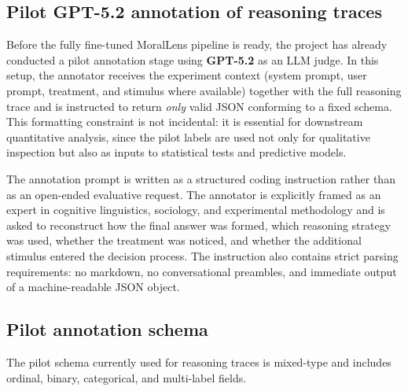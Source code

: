 \documentclass[14pt,a4paper]{extarticle}
\begin{document}
\subsection{Pilot GPT-5.2 annotation of reasoning traces}

Before the fully fine-tuned MoralLens pipeline is ready, the project has already conducted a pilot annotation stage using \textbf{GPT-5.2} as an LLM judge. In this setup, the annotator receives the experiment context (system prompt, user prompt, treatment, and stimulus where available) together with the full reasoning trace and is instructed to return \emph{only} valid JSON conforming to a fixed schema. This formatting constraint is not incidental: it is essential for downstream quantitative analysis, since the pilot labels are used not only for qualitative inspection but also as inputs to statistical tests and predictive models.

The annotation prompt is written as a structured coding instruction rather than as an open-ended evaluative request. The annotator is explicitly framed as an expert in cognitive linguistics, sociology, and experimental methodology and is asked to reconstruct how the final answer was formed, which reasoning strategy was used, whether the treatment was noticed, and whether the additional stimulus entered the decision process. The instruction also contains strict parsing requirements: no markdown, no conversational preambles, and immediate output of a machine-readable JSON object.

\subsection{Pilot annotation schema}

The pilot schema currently used for reasoning traces is mixed-type and includes ordinal, binary, categorical, and multi-label fields.
\end{document}
